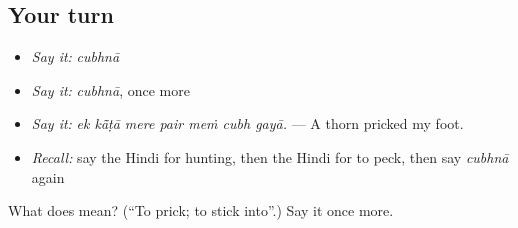 \subsection*{Your turn}
\begin{itemize}
\raggedright
  \item \emph{Say it:} \emph{cubhnā}
  \item \emph{Say it:} \emph{cubhnā}, once more
  \item \emph{Say it:} \emph{ek kā̃ṭā mere pair meṁ cubh gayā.} — A thorn pricked my foot.
  \item \emph{Recall:} say the Hindi for hunting, then the Hindi for to peck, then say \emph{cubhnā} again
\end{itemize}

\begin{tcolorbox}[breakable,colback=teal!4,colframe=teal!35!black,title={Before you move on}]
What does  mean? (\textquotedblleft{}To prick; to stick into\textquotedblright{}.) Say it once more.
\end{tcolorbox}

